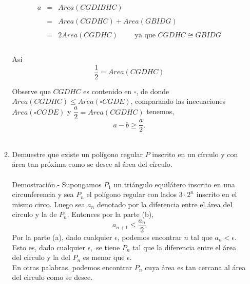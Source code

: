 \begin{enumerate}[\bfseries 1.]
\begin{enumerate}[\bfseries (a)]
		$$\begin{array}{rcl}
		    a&=&Area(CGDIBHC)\\\\
		     &=&Area(CGDHC)+Area(GBIDG)\\\\
		     &=&2Area(CGDHC)\qquad \mbox{ ya que } CGDHC \cong GBIDG\\\\
		\end{array}$$

		Así
		$$\dfrac{1}{2}=Area(CGDHC)$$

		Observe que $CGDHC$ es contenido en $\square$, de donde $Area(CGDHC)\leq Area(\square CGDE)$, comparando las inecuaciones $Area(\square CGDE)$ y $\dfrac{a}{2}=Area(CGDHC)$ tenemos,
		$$a-b\geq \dfrac{a}{2}.$$\\


	    \item Demuestre que existe un polígono regular $P$ inscrito en un círculo y con área tan próxima como se desee al área del círculo.\\\\
		Demostración.-\; Supongamos $P_1$ un triángulo equilátero inscrito en una circunferencia y sea $P_n$ el polígono regular con lados $3\cdot 2^n$ inscrito en el mismo circo. Luego sea $a_n$ denotado por la diferencia entre el área del circulo y la de $P_n$. Entonces por la parte (b),
		$$a_{n+1}\leq \dfrac{a_n}{2}$$
		Por la parte (a), dado cualquier $\epsilon$, podemos encontrar $n$ tal que $a_n<\epsilon$. Esto es, dado cualquier $\epsilon,$ se tiene $P_n$ tal que la diferencia entre el área del circulo y la del $P_n$ es menor que $\epsilon.$\\
		En otras palabras, podemos encontrar $P_n$ cuya área es tan cercana al área del circulo como se desee.\\\\


\end{enumerate}
\end{enumerate}
